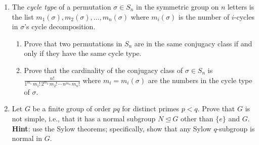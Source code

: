 \documentclass[11pt]{article}
\begin{document}
\begin{enumerate}
\item The \emph{cycle type} of a permutation $\sigma \in S_n$ in the symmetric group on $n$ letters is the list $m_1(\sigma),m_2(\sigma),\ldots,m_n(\sigma)$ where $m_i(\sigma)$ is the number of $i$-cycles in $\sigma$'s cycle decomposition.
\begin{enumerate}
\item Prove that two permutations in $S_n$ are in the same conjugacy class if and only if they have the same cycle type.
\item Prove that the cardinality of the conjugacy class of $\sigma \in S_n$ is $\displaystyle \frac{n!}{1^{m_1}\, m_1! \, 2^{m_2}\, m_2! \, \cdots \, n^{m_n}\, m_n!}$ where $m_i = m_i(\sigma)$ are the numbers in the cycle type of $\sigma$.
\end{enumerate}

\item Let $G$ be a finite group of order $pq$ for distinct primes $p < q$. Prove that $G$ is not simple, i.e., that it has a normal subgroup $N\trianglelefteq G$ other than $\{e\}$ and $G$. \\ {\bf Hint}: use the Sylow theorems; specifically, show that any Sylow $q$-subgroup is normal in $G$.

\end{enumerate}
\end{document}
